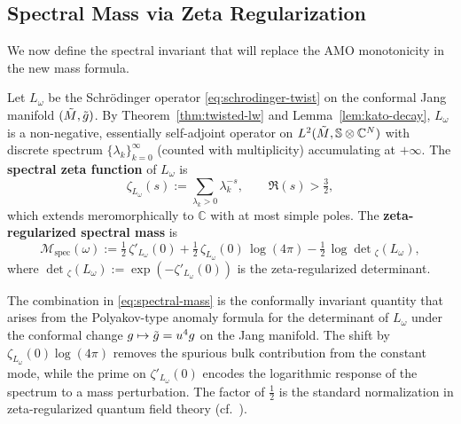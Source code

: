 \subsection{Spectral Mass via Zeta Regularization}

We now define the spectral invariant that will replace the AMO monotonicity in the new mass formula.

\begin{definition}\label{def:spectral-mass}
Let $L_\omega$ be the Schr\"odinger operator \eqref{eq:schrodinger-twist} on the conformal Jang manifold $(\tilde{M},\tilde{g})$. By Theorem~\ref{thm:twisted-lw} and Lemma~\ref{lem:kato-decay}, $L_\omega$ is a non-negative, essentially self-adjoint operator on $L^2(\tilde{M},\mathbb{S}\otimes\mathbb{C}^N)$ with discrete spectrum $\{\lambda_k\}_{k=0}^\infty$ (counted with multiplicity) accumulating at $+\infty$. The \textbf{spectral zeta function} of $L_\omega$ is
\begin{equation}\label{eq:zeta-def}
\zeta_{L_\omega}(s) := \sum_{\lambda_k > 0} \lambda_k^{-s}, \qquad \Re(s) > \tfrac{3}{2},
\end{equation}
which extends meromorphically to $\mathbb{C}$ with at most simple poles. The \textbf{zeta-regularized spectral mass} is
\begin{equation}\label{eq:spectral-mass}
\mathcal{M}_{\mathrm{spec}}(\omega) := \tfrac{1}{2}\,\zeta'_{L_\omega}(0) + \tfrac{1}{2}\,\zeta_{L_\omega}(0)\,\log(4\pi) - \tfrac{1}{2}\,\log\det{}_{\zeta}(L_\omega),
\end{equation}
where $\det{}_\zeta(L_\omega) := \exp(-\zeta'_{L_\omega}(0))$ is the zeta-regularized determinant.
\end{definition}

\begin{remark}
The combination in \eqref{eq:spectral-mass} is the conformally invariant quantity that arises from the Polyakov-type anomaly formula for the determinant of $L_\omega$ under the conformal change $g \mapsto \tilde{g} = u^4 g$ on the Jang manifold. The shift by $\zeta_{L_\omega}(0)\log(4\pi)$ removes the spurious bulk contribution from the constant mode, while the prime on $\zeta'_{L_\omega}(0)$ encodes the logarithmic response of the spectrum to a mass perturbation. The factor of $\tfrac{1}{2}$ is the standard normalization in zeta-regularized quantum field theory (cf.\ \cite{hawking1977, vassilevich2003}).
\end{remark}


